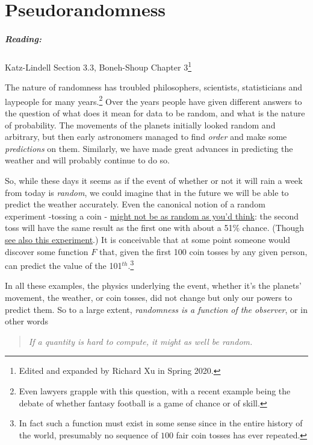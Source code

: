 \chapter{Pseudorandomness}\label{3-Pseudorandomness}

\paragraph{Reading:} Katz-Lindell Section 3.3, Boneh-Shoup Chapter
3\footnote{Edited and expanded by Richard Xu in Spring 2020.}

The nature of randomness has troubled philosophers, scientists,
statisticians and laypeople for many years.\footnote{Even lawyers
  grapple with this question, with a recent example being the debate of
  whether fantasy football is a game of chance or of skill.} Over the
years people have given different answers to the question of what does
it mean for data to be random, and what is the nature of probability.
The movements of the planets initially looked random and arbitrary, but
then early astronomers managed to find \emph{order} and make some
\emph{predictions} on them. Similarly, we have made great advances in
predicting the weather and will probably continue to do so.

So, while these days it seems as if the event of whether or not it will
rain a week from today is \emph{random}, we could imagine that in the
future we will be able to predict the weather accurately. Even the
canonical notion of a random experiment -tossing a coin -
\href{http://statweb.stanford.edu/~susan/papers/headswithJ.pdf}{might
not be as random as you'd think}: the second toss will have the same
result as the first one with about a 51\% chance. (Though
\href{https://www.stat.berkeley.edu/~aldous/Real-World/coin_tosses.html}{see
also this experiment}.) It is conceivable that at some point someone
would discover some function \(F\) that, given the first 100 coin tosses
by any given person, can predict the value of the
101\(^{th}\).\footnote{In fact such a function must exist in some sense
  since in the entire history of the world, presumably no sequence of
  \(100\) fair coin tosses has ever repeated.}

In all these examples, the physics underlying the event, whether it's
the planets' movement, the weather, or coin tosses, did not change but
only our powers to predict them. So to a large extent, \emph{randomness
is a function of the observer}, or in other words

\begin{quote}
\emph{If a quantity is hard to compute, it might as well be random.}
\end{quote}


